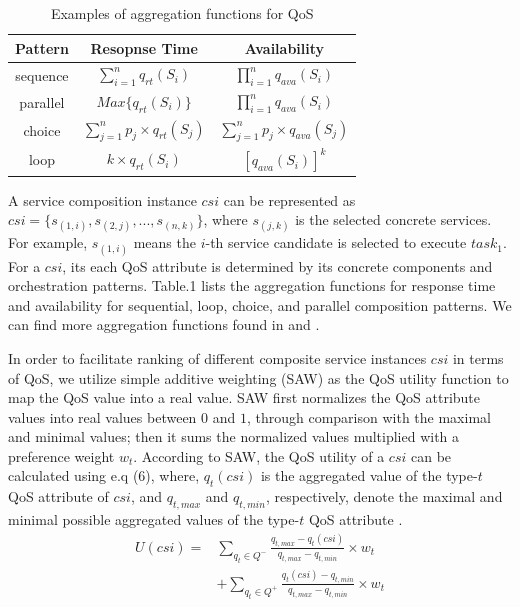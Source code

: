 \documentclass[10pt,journal,compsoc]{IEEEtran}
\begin{document}
\begin{table}[!t]
\renewcommand{\arraystretch}{1.3}
\caption{Examples of aggregation functions for QoS}
\label{aggregation functions}
\centering
\begin{tabular}{ccc}
\hline
\bfseries Pattern & \bfseries Resopnse Time & \bfseries Availability \\
\hline
sequence & $\sum_{i=1}^{n}q_{rt}(S_i)$ & $\prod_{i=1}^{n}q_{ava}(S_i)$ \\
parallel & $Max\{q_{rt}(S_i)\}$ & $\prod_{i=1}^{n}q_{ava}(S_i)$ \\
choice & $\sum_{j=1}^{n} p_j \times q_{rt}(S_j)$ & $\sum_{j=1}^{n} p_j \times q_{ava}(S_j)$ \\
loop & $k \times q_{rt}(S_i)$ & $[q_{ava}(S_i)]^{k}$ \\
\hline
\end{tabular}
\end{table}

A service composition instance $csi$ can be represented as $csi = \{s_{(1,i)}, s_{(2,j)},...,s_{(n,k)}\}$, where $s_{(j,k)}$ is the selected concrete services. For example, $s_{(1,i)}$ means the $i$-th service candidate is selected to execute $task_1$. For a $csi$, its each QoS attribute is determined by its concrete components and orchestration patterns. Table.1 lists the aggregation functions for response time and availability for sequential, loop, choice, and parallel composition patterns. We can find more aggregation functions found in \cite{jaeger2004qos} and \cite{zheng2013qos}.

In order to facilitate ranking of different composite service instances $csi$ in terms of QoS, we utilize simple additive weighting (SAW) as the QoS utility function to map the QoS value into a real value. SAW first normalizes the QoS attribute values into real values between $0$ and $1$, through comparison with the maximal and minimal values; then it sums the normalized values multiplied with a preference weight $w_t$. According to SAW, the QoS utility of a $csi$ can be calculated using e.q (6), where, $q_t(csi)$ is the aggregated value of the type-$t$ QoS attribute of $csi$, and $q_{t,max}$ and $q_{t,min}$, respectively, denote the maximal and minimal possible aggregated values of the type-$t$ QoS attribute \cite{Wu2016}.
\begin{align}
U(csi) = & \sum_{q_t \in Q^-} \frac{q_{t,max}-q_t(csi)}{q_{t,max}-q_{t,min}}\times w_t \\\nonumber
& +\sum_{q_t \in Q^+} \frac{q_t(csi)-q_{t,min}}{q_{t,max}-q_{t,min}}\times w_t
\end{align}
\end{document}
